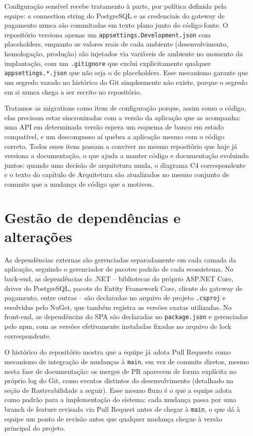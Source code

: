 \documentclass[a4paper,12pt,oneside,openany]{book}
\begin{document}
Configuração sensível recebe tratamento à parte, por política definida pela equipe: a connection string do PostgreSQL e as credenciais do gateway de pagamento nunca são commitadas em texto plano junto do código-fonte. O repositório versiona apenas um \texttt{appsettings.Development.json} com placeholders, enquanto os valores reais de cada ambiente (desenvolvimento, homologação, produção) são injetados via variáveis de ambiente no momento da implantação, com um \texttt{.gitignore} que exclui explicitamente qualquer \texttt{appsettings.*.json} que não seja o de placeholders. Esse mecanismo garante que um segredo vazado no histórico do Git simplesmente não existe, porque o segredo em si nunca chega a ser escrito no repositório.

Tratamos as migrations como item de configuração porque, assim como o código, elas precisam estar sincronizadas com a versão da aplicação que as acompanha: uma API em determinada versão espera um esquema de banco em estado compatível, e um descompasso aí quebra a aplicação mesmo com o código correto. Todos esses itens passam a conviver no mesmo repositório que hoje já versiona a documentação, o que ajuda a manter código e documentação evoluindo juntos: quando uma decisão de arquitetura muda, o diagrama C4 correspondente e o texto do capítulo de Arquitetura são atualizados no mesmo conjunto de commits que a mudança de código que a motivou.

\section{Gestão de dependências e alterações}

As dependências externas são gerenciadas separadamente em cada camada da aplicação, seguindo o gerenciador de pacotes padrão de cada ecossistema. No back-end, as dependências do .NET -- bibliotecas do próprio ASP.NET Core, driver do PostgreSQL, pacote do Entity Framework Core, cliente do gateway de pagamento, entre outras -- são declaradas no arquivo de projeto \texttt{.csproj} e resolvidas pelo NuGet, que também registra as versões exatas utilizadas. No front-end, as dependências do SPA são declaradas no \texttt{package.json} e gerenciadas pelo npm, com as versões efetivamente instaladas fixadas no arquivo de lock correspondente.

O histórico do repositório mostra que a equipe já adota Pull Requests como mecanismo de integração de mudanças à \texttt{main}, em vez de commits diretos, mesmo nesta fase de documentação: os merges de PR aparecem de forma explícita no próprio log do Git, como eventos distintos do desenvolvimento (detalhado na seção de Rastreabilidade a seguir). Esse mesmo fluxo é o que a equipe adota como padrão para a implementação do sistema: cada mudança passa por uma branch de feature revisada via Pull Request antes de chegar à \texttt{main}, o que dá à equipe um ponto de revisão antes que qualquer mudança chegue à versão principal do projeto.
\end{document}
